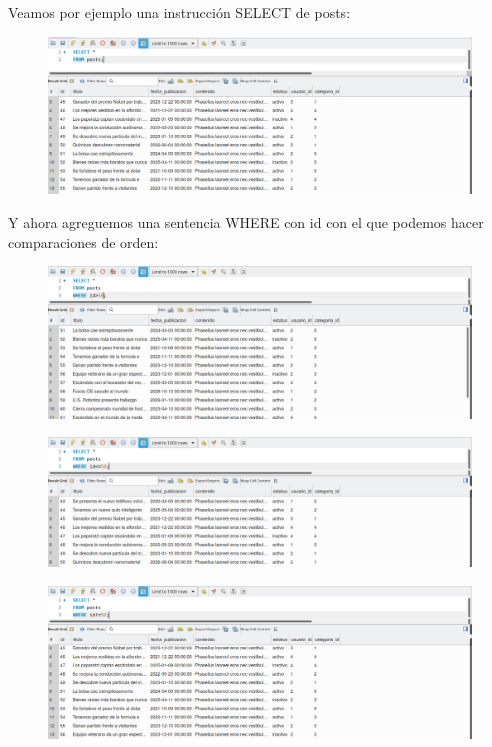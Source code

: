 \documentclass{article}
\begin{document}
Veamos por ejemplo una instrucción SELECT de posts:
\begin{figure}[h!]
  \centering
  \includegraphics[scale=0.75]{./Pictures/102_where.png}
\end{figure}

Y ahora agreguemos una sentencia WHERE con id con el que podemos hacer comparaciones de orden:
\begin{figure}[h!]
  \centering
  \includegraphics[scale=0.75]{./Pictures/103_where.png}
\end{figure}

\begin{figure}[h!]
  \centering
  \includegraphics[scale=0.75]{./Pictures/104_where.png}
\end{figure}

\begin{figure}[h!]
  \centering
  \includegraphics[scale=0.75]{./Pictures/107_where_id_dif.png}
\end{figure}
\end{document}
